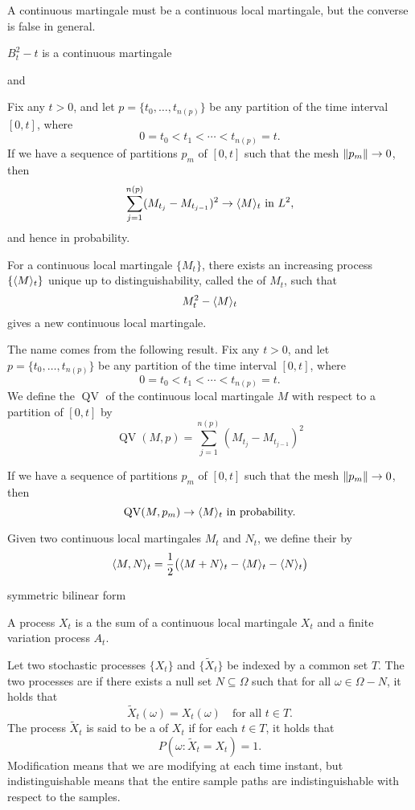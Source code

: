 \documentclass[10pt]{book}
\begin{document}
A continuous martingale must be a continuous local martingale, but the converse is false in general.

$B_t^2 - t$ is a continuous martingale

and 

Fix any $t > 0$, and let $p = \{t_0,\dotsc,t_{n(p)}\}$ be any partition of the time interval $[0,t]$, where \[
        0 = t_0 < t_1 < \dotsb < t_{n(p)} = t.
    \] 
    If we have a sequence of partitions $p_m$ of $[0,t]$ such that the mesh $\lVert p_m \rVert \to 0$, then \[
        \sum_{j=1}^{n(p)}(M_{t_{j}} - M_{t_{j-1}})^2 \to \langle M \rangle_t\text{ in }L^2,
    \] and hence in probability.

\begin{thm}
    For a continuous local martingale $\{M_t\}$, there exists an increasing process $\{\langle M \rangle_t\}$ unique up to distinguishability, called the  of $M_t$, such that \[
        M_t^2 - \langle M \rangle_t
    \] gives a new continuous local martingale.
    
    The name comes from the following result. Fix any $t > 0$, and let $p = \{t_0,\dotsc,t_{n(p)}\}$ be any partition of the time interval $[0,t]$, where \[
        0 = t_0 < t_1 < \dotsb < t_{n(p)} = t.
    \] We define the $\operatorname{QV}$ of the continuous local martingale $M$ with respect to a partition of $[0,t]$ by \[
        \operatorname{QV}(M,p) = \sum_{j=1}^{n(p)}(M_{t_{j}} - M_{t_{j-1}})^2
    \]
    
    If we have a sequence of partitions $p_m$ of $[0,t]$ such that the mesh $\lVert p_m \rVert \to 0$, then \[
        \operatorname{QV}(M,p_m) \to \langle M \rangle_t\text{ in probability.}
    \] %
\end{thm}

Given two continuous local martingales $M_t$ and $N_t$, we define their  by \[
    \langle M, N \rangle_t = \frac{1}{2}\bigl(\langle M + N \rangle_t - \langle M \rangle_t - \langle N \rangle_t\bigr)
\]



symmetric bilinear form

A process $X_t$ is a  the sum of a continuous local martingale $X_t$ and a finite variation process $A_t$.

Let two stochastic processes $\{X_t\}$ and $\{\widetilde{X}_t\}$ be indexed by a common set $T$. The two processes are  if there exists a null set $N \subseteq \Omega$ such that for all $\omega \in \Omega - N$, it holds that \[
    \widetilde{X}_t(\omega) = X_t(\omega)\quad \text{for all }t\in T.
\] The process $\widetilde{X}_t$ is said to be a  of $X_t$ if for each $t \in T$, it holds that \[
    P(\omega: \widetilde{X}_t = X_t) = 1.
\] Modification means that we are modifying at each time instant, but indistinguishable means that the entire sample paths are indistinguishable with respect to the samples.
\end{document}
